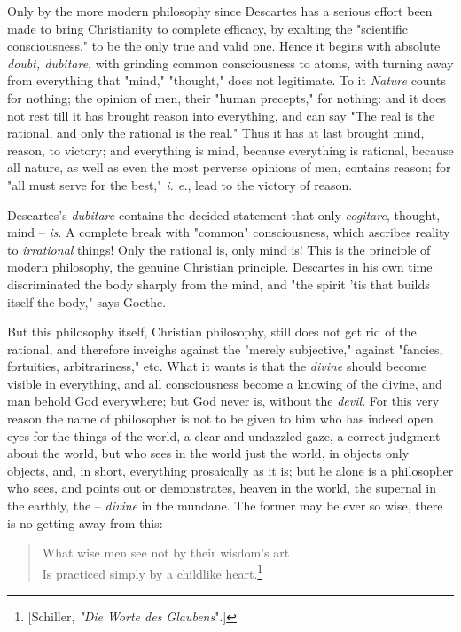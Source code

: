 \documentclass[a4paper]{book}
\begin{document}
Only by the more modern philosophy since Descartes has a serious effort been 
made to bring Christianity to complete efficacy, by exalting the "{}scientific 
consciousness."{} to be the only true and valid one. Hence it begins with 
absolute \textit{doubt, dubitare}, with grinding common consciousness to 
atoms, with turning away from everything that "{}mind,"{} "{}thought,"{} does 
not legitimate. To it \textit{Nature} counts for nothing; the opinion of men, 
their "{}human precepts,"{} for nothing: and it does not rest till it has 
brought reason into everything, and can say "{}The real is the rational, and 
only the rational is the real."{} Thus it has at last brought mind, reason, to 
victory; and everything is mind, because everything is rational, because all 
nature, as well as even the most perverse opinions of men, contains reason; 
for "{}all must serve for the best,"{} \textit{i. e.}, lead to the victory of 
reason.

Descartes's \textit{dubitare} contains the decided statement that only 
\textit{cogitare}, thought, mind -- \textit{is}. A complete break with 
"{}common"{} consciousness, which ascribes reality to \textit{irrational} 
things! Only the rational is, only mind is! This is the principle of modern 
philosophy, the genuine Christian principle. Descartes in his own time 
discriminated the body sharply from the mind, and "{}the spirit 'tis that 
builds itself the body,"{} says Goethe.

But this philosophy itself, Christian philosophy, still does not get rid of 
the rational, and therefore inveighs against the "{}merely subjective,"{} 
against "{}fancies, fortuities, arbitrariness,"{} etc. What it wants is that 
the \textit{divine} should become visible in everything, and all consciousness 
become a knowing of the divine, and man behold God everywhere; but God never 
is, without the \textit{devil}. For this very reason the name of philosopher 
is not to be given to him who has indeed open eyes for the things of the 
world, a clear and undazzled gaze, a correct judgment about the world, but who 
sees in the world just the world, in objects only objects, and, in short, 
everything prosaically as it is; but he alone is a philosopher who sees, and 
points out or demonstrates, heaven in the world, the supernal in the earthly, 
the -- \textit{divine} in the mundane. The former may be ever so wise, there 
is no getting away from this:

\begin{quotation}

\noindent{}What wise men see not by their wisdom's art\\
 Is practiced simply by a childlike heart.\footnote{[Schiller, \textit{"{}Die 
Worte des Glaubens}"{}.]}\end{quotation}
\end{document}
